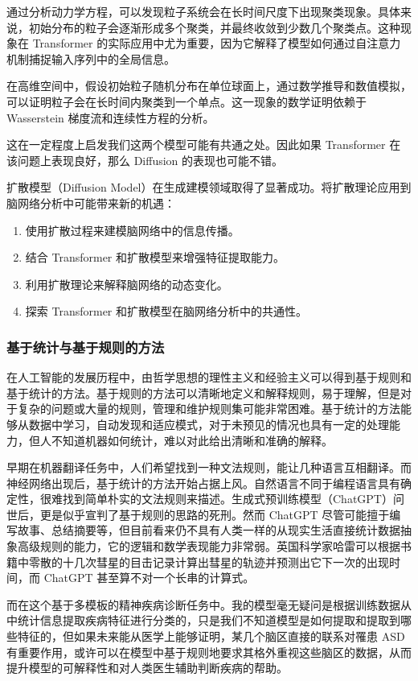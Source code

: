 \documentclass[12pt,a4paper]{article}
\begin{document}
通过分析动力学方程，可以发现粒子系统会在长时间尺度下出现聚类现象。具体来说，初始分布的粒子会逐渐形成多个聚类，并最终收敛到少数几个聚类点。这种现象在 Transformer 的实际应用中尤为重要，因为它解释了模型如何通过自注意力机制捕捉输入序列中的全局信息。

在高维空间中，假设初始粒子随机分布在单位球面上，通过数学推导和数值模拟，可以证明粒子会在长时间内聚类到一个单点。这一现象的数学证明依赖于 Wasserstein 梯度流和连续性方程的分析。

这在一定程度上启发我们这两个模型可能有共通之处。因此如果 Transformer 在该问题上表现良好，那么 Diffusion 的表现也可能不错。

扩散模型（Diffusion Model）在生成建模领域取得了显著成功。将扩散理论应用到脑网络分析中可能带来新的机遇：

\begin{enumerate}
\item 使用扩散过程来建模脑网络中的信息传播。
\item 结合 Transformer 和扩散模型来增强特征提取能力。
\item 利用扩散理论来解释脑网络的动态变化。
\item 探索 Transformer 和扩散模型在脑网络分析中的共通性。
\end{enumerate}

\subsubsection{基于统计与基于规则的方法}

在人工智能的发展历程中，由哲学思想的理性主义和经验主义可以得到基于规则和基于统计的方法。基于规则的方法可以清晰地定义和解释规则，易于理解，但是对于复杂的问题或大量的规则，管理和维护规则集可能非常困难。基于统计的方法能够从数据中学习，自动发现和适应模式，对于未预见的情况也具有一定的处理能力，但人不知道机器如何统计，难以对此给出清晰和准确的解释。

早期在机器翻译任务中，人们希望找到一种文法规则，能让几种语言互相翻译。而神经网络出现后，基于统计的方法开始占据上风。自然语言不同于编程语言具有确定性，很难找到简单朴实的文法规则来描述。生成式预训练模型（ChatGPT）问世后，更是似乎宣判了基于规则的思路的死刑。然而 ChatGPT 尽管可能擅于编写故事、总结摘要等，但目前看来仍不具有人类一样的从现实生活直接统计数据抽象高级规则的能力，它的逻辑和数学表现能力非常弱。英国科学家哈雷可以根据书籍中零散的十几次彗星的目击记录计算出彗星的轨迹并预测出它下一次的出现时间，而 ChatGPT 甚至算不对一个长串的计算式。

而在这个基于多模板的精神疾病诊断任务中。我的模型毫无疑问是根据训练数据从中统计信息提取疾病特征进行分类的，只是我们不知道模型是如何提取和提取到哪些特征的，但如果未来能从医学上能够证明，某几个脑区直接的联系对罹患 ASD 有重要作用，或许可以在模型中基于规则地要求其格外重视这些脑区的数据，从而提升模型的可解释性和对人类医生辅助判断疾病的帮助。
\end{document}

